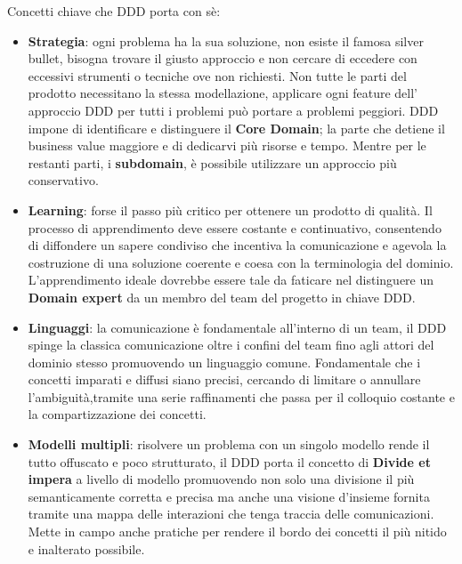     
    
    Concetti chiave che DDD porta con sè:
    
        \begin{itemize}
        \item \textbf{Strategia}: ogni problema ha la sua soluzione, non esiste il famosa silver bullet, bisogna trovare il giusto approccio e non cercare di eccedere con eccessivi strumenti o tecniche ove non richiesti.
        Non tutte le parti del prodotto necessitano la stessa modellazione, applicare ogni feature dell' approccio DDD per tutti i problemi può portare a problemi peggiori.
        DDD impone di identificare e distinguere il \textbf{Core Domain}; la parte che detiene il business value maggiore e di dedicarvi più risorse e tempo.
        Mentre per le restanti parti, i \textbf{subdomain}, è possibile utilizzare un approccio più conservativo.
        
        \item \textbf{Learning}: forse il passo più critico per ottenere un prodotto di qualità. Il processo di apprendimento deve essere costante e continuativo, consentendo di diffondere un sapere condiviso che incentiva la comunicazione e agevola la costruzione di una soluzione coerente e coesa con la terminologia del dominio. 
        L'apprendimento ideale dovrebbe essere tale da faticare nel distinguere un \textbf{Domain expert} da un membro del team del progetto in chiave DDD.
        
        \item \textbf{Linguaggi}: la comunicazione è fondamentale all'interno di un team, il DDD spinge la classica comunicazione oltre i confini del team fino agli attori del dominio stesso promuovendo un linguaggio comune.
        Fondamentale che i concetti imparati e diffusi siano precisi, cercando di limitare o annullare l'ambiguità,tramite una serie raffinamenti che passa per il colloquio costante e la compartizzazione dei concetti.
        
        \item \textbf{Modelli multipli}: risolvere un problema con un singolo modello rende il tutto offuscato e poco strutturato, il DDD porta il concetto di \textbf{Divide et impera} a livello di modello promuovendo non solo una divisione il più semanticamente corretta e precisa ma anche una visione d'insieme fornita tramite una mappa delle interazioni che tenga traccia delle comunicazioni.
        Mette in campo anche pratiche per rendere il bordo dei concetti il più nitido e inalterato possibile.
        

\end{itemize}
